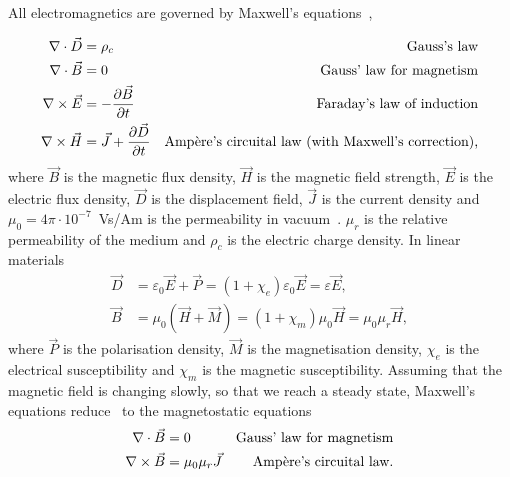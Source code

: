 All electromagnetics are governed by Maxwell's equations~\cite{cheng, feynman, Nordling:1995:PHS},

\begin{align}
	\nabla \cdot \vec{D} &= \rho_c & \text{Gauss's law}\index{Maxwell's equations!Gauss's law}\index{Gauss's law|see{Maxwell's equations}}\label{eq:gauss}\\
	\nabla \cdot \vec{B} &= 0 & \text{Gauss' law for magnetism}\index{Maxwell's equations!Gauss' law for magnetism}\index{Gauss' law for magnetism|see{Maxwell's equations}}\label{eq:gaussmag}\\
	\nabla \times \vec{E} &= -\frac{\partial\vec{B}}{\partial{}t} & \text{Faraday's law of induction}\index{Maxwell's equations!Faraday's law of induction}\index{Faraday's law of induction|see{Maxwell's equations}}\label{eq:faraday}\\
	\nabla \times \vec{H} &= \vec{J} + \frac{\partial{}\vec{D}}{\partial{}t} & \text{Amp\`{e}re's circuital law
	(with Maxwell's correction),}\index{Maxwell's equations!Amp\`{e}re's Circuital Law!with Maxwell's correction}\index{Amp\`{e}re's Circuital Law@amperes circuital|see{Maxwell's equations}}\label{eq:ampere}
\end{align}
where $\vec{B}$ is the magnetic flux density, $\vec{H}$ is the magnetic field strength, $\vec{E}$ is the electric flux density, $\vec{D}$ is the displacement field, $\vec{J}$ is the current density and \mbox{$\mu_0 =  4\pi \cdot 10^{-7}$ Vs/Am} is the permeability in vacuum~\cite{Nordling:1995:PHS}. $\mu_r$ is the relative permeability of the medium and $\rho_c$ is the electric charge density. In linear materials
\begin{align}
	\vec{D} &= \varepsilon_0 \vec{E} + \vec{P} = (1 + \chi_e) \varepsilon_0 \vec{E}
= \varepsilon \vec{E},\\
	\vec{B} &= \mu_0 (\vec{H} + \vec{M}) = (1 + \chi_m) \mu_0 \vec{H} = \mu_0\mu_r \vec{H},
\end{align}
where $\vec{P}$ is the polarisation density, $\vec{M}$ is the magnetisation density, $\chi_e$ is the electrical susceptibility and $\chi_m$ is the magnetic susceptibility. Assuming that the magnetic field is changing slowly, so that we reach a steady state, Maxwell's equations reduce~\cite{cheng, feynman, Nordling:1995:PHS} to the magnetostatic equations
\begin{align}
	\nabla \cdot \vec{B} &= 0 & \text{Gauss' law for magnetism\index{Maxwell's equations!Gauss' law for magnetism!magnetostatics}}\label{eq:gaussmagstat}\\
	\nabla \times \vec{B} &= \mu_0 \mu_r \vec{J} & \text{Amp\`{e}re's circuital law.\index{Maxwell's equations!Amp\`{e}re's Circuital Law!magnetostatics}}\label{eq:amperestat}
\end{align}
